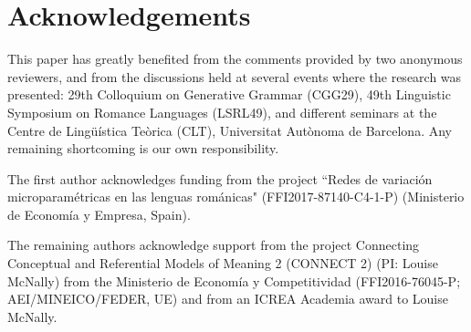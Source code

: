 \documentclass[output=paper,colorlinks,citecolor=brown,
]{langscibook}
\begin{document}
\section*{Acknowledgements}
This paper has greatly benefited from the comments provided by two anonymous reviewers, and from the discussions held at several events where the research was presented: 29th Colloquium on Generative Grammar (CGG29), 49th Linguistic Symposium on Romance Languages (LSRL49), and different seminars at the Centre de Lingüística Teòrica (CLT), Universitat Autònoma de Barcelona. Any remaining shortcoming is our own responsibility.

The first author acknowledges funding from the project ``Redes de variación microparamétricas en las lenguas románicas" (FFI2017-87140-C4-1-P) (Ministerio de Economía y Empresa, Spain).

The remaining authors acknowledge support from the project Connecting Conceptual and Referential Models of Meaning 2 (CONNECT 2) (PI: Louise McNally) from the Ministerio de Economía y Competitividad (FFI2016-76045-P;\\ 
AEI/MINEICO/FEDER, UE) and from an ICREA Academia award to Louise McNally.

\printbibliography[heading=subbibliography,notkeyword=this]
\end{document}
